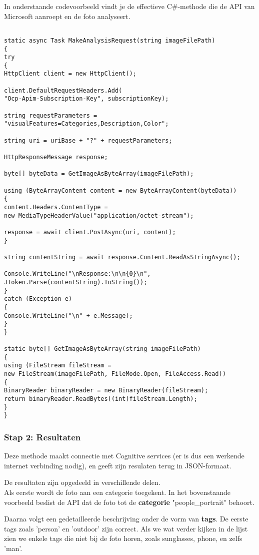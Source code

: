In onderstaande codevoorbeeld vindt je de effectieve C\#-methode die de API van Microsoft aanroept en de foto analyseert. 

\begin{lstlisting}[frame=single]

static async Task MakeAnalysisRequest(string imageFilePath)
{
try
{
HttpClient client = new HttpClient();

client.DefaultRequestHeaders.Add(
"Ocp-Apim-Subscription-Key", subscriptionKey);

string requestParameters =
"visualFeatures=Categories,Description,Color";

string uri = uriBase + "?" + requestParameters;

HttpResponseMessage response;

byte[] byteData = GetImageAsByteArray(imageFilePath);

using (ByteArrayContent content = new ByteArrayContent(byteData))
{
content.Headers.ContentType =
new MediaTypeHeaderValue("application/octet-stream");

response = await client.PostAsync(uri, content);
}

string contentString = await response.Content.ReadAsStringAsync();

Console.WriteLine("\nResponse:\n\n{0}\n",
JToken.Parse(contentString).ToString());
}
catch (Exception e)
{
Console.WriteLine("\n" + e.Message);
}
}

static byte[] GetImageAsByteArray(string imageFilePath)
{
using (FileStream fileStream =
new FileStream(imageFilePath, FileMode.Open, FileAccess.Read))
{
BinaryReader binaryReader = new BinaryReader(fileStream);
return binaryReader.ReadBytes((int)fileStream.Length);
}
}

\end{lstlisting}

\subsubsection{Stap 2: Resultaten}
Deze methode maakt connectie met Cognitive services (er is dus een werkende internet verbinding nodig), en geeft zijn resulaten terug in JSON-formaat. 

De resultaten zijn opgedeeld in verschillende delen.\\ Als eerste wordt de foto aan een categorie toegekent. In het bovenstaande voorbeeld beslist de API dat de foto tot de \textbf{categorie} "people\_portrait" behoort. 

Daarna volgt een gedetailleerde beschrijving onder de vorm van \textbf{tags}. De eerste tags zoals 'person' en 'outdoor' zijn correct. Als we wat verder kijken in de lijst zien we enkele tags die niet bij de foto horen, zoals sunglasses, phone, en zelfs 'man'. 

